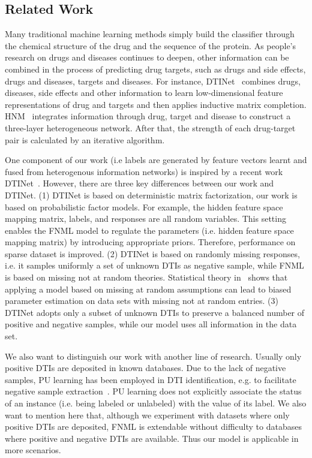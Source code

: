 \documentclass[journal]{IEEEtran}
\begin{document}
\subsection{Related Work}
Many traditional machine learning methods simply build the classifier through the chemical structure of the drug and the sequence of the protein. As people's research on drugs and diseases continues to deepen, other information can be combined in the process of predicting drug targets, such as drugs and side effects, drugs and diseases, targets and diseases. For instance, DTINet~\cite{Luo2017Network} combines drugs, diseases, side effects and other information to learn low-dimensional feature representations of drug and targets and then applies inductive matrix completion. HNM~\cite{Wang2014Drug} integrates information through drug, target and disease to construct a three-layer heterogeneous network. After that, the strength of each drug-target pair is calculated by an iterative algorithm. 

One component of our work (i.e labels are generated by feature vectors learnt and fused from heterogenous information networks) is inspired by a recent work DTINet~\cite{Luo2017Network}. However, there are three key differences between our work and DTINet. (1) DTINet is based on deterministic matrix factorization, our work is based on probabilistic factor models. For example, the hidden feature space mapping matrix, labels, and responses are all random variables. This setting enables the FNML model to regulate the parameters (i.e. hidden feature space mapping matrix) by introducing appropriate priors. Therefore, performance on sparse dataset is improved. (2) DTINet is based on randomly missing responses, i.e. it samples uniformly a set of unknown DTIs as negative sample, while FNML is based on missing not at random theories. Statistical theory in~\cite{Little1987Statistical} shows that applying a model based on missing at random assumptions can lead to biased parameter estimation on data sets with missing not at random entries. (3) DTINet adopts only a subset of unknown DTIs to preserve a balanced number of positive and negative samples, while our model uses all information in the data set.

We also want to distinguish our work with another line of research. Usually only positive DTIs are deposited in known databases. Due to the lack of negative samples, PU learning has been employed in DTI identification, e.g. to facilitate negative sample extraction~\cite{Peng2017Screening}. PU learning does not explicitly associate the status of an instance (i.e. being labeled or unlabeled) with the value of its label. We also want to mention here that, although we experiment with datasets where only positive DTIs are deposited, FNML is extendable without difficulty to databases where positive and negative DTIs are available. Thus our model is applicable in more scenarios.
\end{document}
